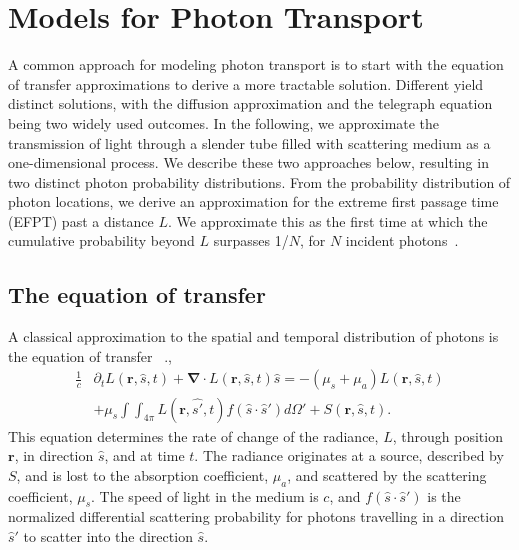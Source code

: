 \section{Models for Photon Transport}\label{sec:predictions}
A common approach for modeling photon transport is to start with the equation of transfer approximations to derive a more tractable solution. Different  yield distinct solutions, with the diffusion approximation and the telegraph equation being two widely used outcomes. In the following, we approximate the transmission of light through a slender tube filled with scattering medium as a one-dimensional process. We describe these two approaches below, resulting in two distinct photon probability distributions. From the probability distribution of photon locations, we derive an approximation for the extreme first passage time (EFPT) past a distance $L$. We approximate this as the first time at which the cumulative probability beyond $L$ surpasses 1/$N$, for $N$ incident photons~\cite{hass_first-passage_2024}. 


\subsection{The equation of transfer}
A classical approximation to the spatial and temporal distribution of photons is the equation of transfer ~\cite{haskell_boundary_1994,ishimaru_wave_1997}.,
%
\begin{align}
    \frac{1}{c} &\partial_{t} L \left(\mathbf{r},\hat{s},t\right) + \mathbf{\nabla} \cdot L\left(\mathbf{r},\hat{s},t\right)\hat{s} = -\left(\mu_{s} + \mu_{a}\right) L\left(\mathbf{r},\hat{s},t\right) \nonumber \\
    &+ \mu_{s} \int \int_{4\pi} L\left(\mathbf{r},\hat{s'},t\right) f\left(\hat{s} \cdot \hat s'\right) d\Omega' + S\left(\mathbf{r},\hat{s},t\right). \label{eq:RTE}
\end{align}
%
This equation determines the rate of change of the radiance, $L$, through position $\mathbf{r}$, in direction $\hat s$, and at time $t$. The radiance originates at a source, described by $S$, and is lost to the absorption coefficient, $\mu_{a}$, and scattered by the scattering coefficient, $\mu_{s}$. The speed of light in the medium is $c$, and $f(\hat s \cdot \hat s')$ is the normalized differential scattering probability for photons travelling in a direction $\hat s'$ to scatter into the direction $\hat s$. 

